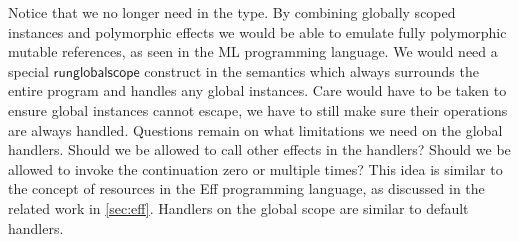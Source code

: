 Notice that we no longer need  in the type.
By combining globally scoped instances and polymorphic effects we would be able to emulate fully polymorphic mutable references, as seen in the ML programming language.
We would need a special $\mathsf{runglobalscope}$ construct in the semantics which always surrounds the entire program and handles any global instances.
Care would have to be taken to ensure global instances cannot escape, we have to still make sure their operations are always handled.
Questions remain on what limitations we need on the global handlers.
Should we be allowed to call other effects in the handlers?
Should we be allowed to invoke the continuation zero or multiple times?
This idea is similar to the concept of resources in the Eff programming language, as discussed in the related work in \cref{sec:eff}.
Handlers on the global scope are similar to default handlers.
